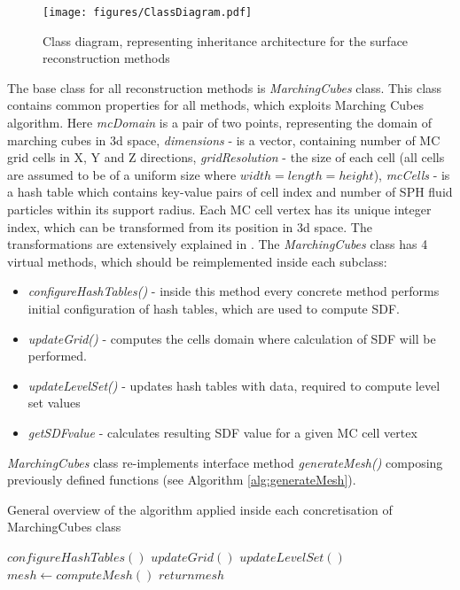 \begin{figure}[H]

	\begin{center}
	\texttt{[image: figures/ClassDiagram.pdf]}
	\end{center}
	\caption{Class diagram, representing inheritance architecture for the surface reconstruction methods}
    \label{fig:class-diagam}
\end{figure}
The base class for all reconstruction methods is \emph{MarchingCubes} class. This class contains common properties for all methods, which exploits Marching Cubes algorithm. Here \emph{mcDomain} is a pair of two points, representing the domain of marching cubes in 3d space, \emph{dimensions} - is a vector, containing number of MC grid cells in X, Y and Z directions, \emph{gridResolution} - the size of each cell (all cells are assumed to be of a uniform size where $width=length=height$), \emph{mcCells} - is a hash table which contains key-value pairs of cell index and number of SPH fluid particles within its support radius. Each MC cell vertex has its unique integer index, which can be transformed from its position in 3d space. The transformations are extensively explained in \cite{Akinchi}. 
The \emph{MarchingCubes} class has 4 virtual methods, which should be reimplemented inside each subclass:
\begin{itemize}
	\item \emph{configureHashTables()} - inside this method every concrete method performs initial configuration of hash tables, which are used to compute SDF.
	\item \emph{updateGrid()} - computes the cells domain where calculation of SDF will be performed.
	\item \emph{updateLevelSet()} - updates hash tables with data, required to compute level set values
	\item \emph{getSDFvalue} - calculates resulting SDF value for a given MC cell vertex
\end{itemize}

\emph{MarchingCubes} class re-implements interface method \emph{generateMesh()} composing previously defined functions (see Algorithm \ref{alg:generateMesh}).

\begin{algorithm}
	\caption{General overview of the algorithm applied inside each concretisation of MarchingCubes class}
	\label{alg:generateMesh}
	\begin{algorithmic}
		\State $configureHashTables()$
		\State $updateGrid()$
		\State $updateLevelSet()$
		\State $mesh \gets computeMesh()$ 
		\State $return mesh$
	\end{algorithmic}
\end{algorithm}

